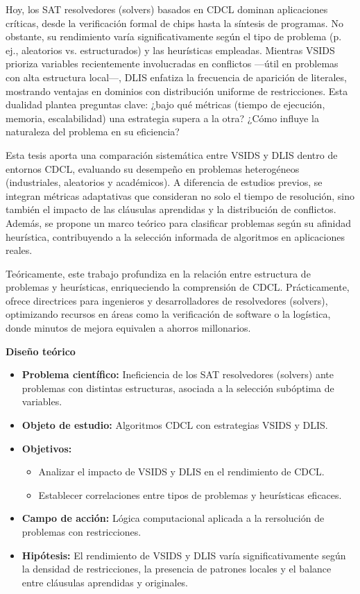 Hoy, los SAT resolvedores (solvers) basados en CDCL dominan aplicaciones críticas, desde la verificación formal de chips hasta la síntesis de programas. No obstante, su rendimiento varía significativamente según el tipo de problema (p. ej., aleatorios vs. estructurados) y las heurísticas empleadas. Mientras VSIDS prioriza variables recientemente involucradas en conflictos —útil en problemas con alta estructura local—, DLIS enfatiza la frecuencia de aparición de literales, mostrando ventajas en dominios con distribución uniforme de restricciones. Esta dualidad plantea preguntas clave: ¿bajo qué métricas (tiempo de ejecución, memoria, escalabilidad) una estrategia supera a la otra? ¿Cómo influye la naturaleza del problema en su eficiencia?

Esta tesis aporta una comparación sistemática entre VSIDS y DLIS dentro de entornos CDCL, evaluando su desempeño en problemas heterogéneos (industriales, aleatorios y académicos). A diferencia de estudios previos, se integran métricas adaptativas que consideran no solo el tiempo de resolución, sino también el impacto de las cláusulas aprendidas y la distribución de conflictos. Además, se propone un marco teórico para clasificar problemas según su afinidad heurística, contribuyendo a la selección informada de algoritmos en aplicaciones reales.

Teóricamente, este trabajo profundiza en la relación entre estructura de problemas y heurísticas, enriqueciendo la comprensión de CDCL. Prácticamente, ofrece directrices para ingenieros y desarrolladores de resolvedores (solvers), optimizando recursos en áreas como la verificación de software o la logística, donde minutos de mejora equivalen a ahorros millonarios.

\textbf{Diseño teórico}
\begin{itemize}
    \item \textbf{Problema científico:} Ineficiencia de los SAT resolvedores (solvers) ante problemas con distintas estructuras, asociada a la selección subóptima de variables.
    \item \textbf{Objeto de estudio:} Algoritmos CDCL con estrategias VSIDS y DLIS.
    \item \textbf{Objetivos:}
    \begin{itemize}
        \item Analizar el impacto de VSIDS y DLIS en el rendimiento de CDCL.
        \item Establecer correlaciones entre tipos de problemas y heurísticas eficaces.
    \end{itemize}
    \item \textbf{Campo de acción:} Lógica computacional aplicada a la rersolución de problemas con restricciones.
    \item \textbf{Hipótesis:} El rendimiento de VSIDS y DLIS varía significativamente según la densidad de restricciones, la presencia de patrones locales y el balance entre cláusulas aprendidas y originales.
\end{itemize}

